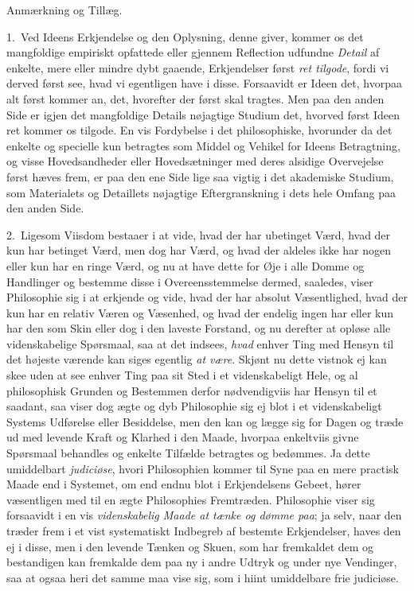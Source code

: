 \documentclass[12pt,a4paper]{book}
\newcommand{\apage}[1]{\marginnote{\footnotesize\textit{[#1]}}}
\begin{document}
\begin{center}Anmærkning og Tillæg.\end{center}

1.~Ved Ideens Erkjendelse og den Oplysning, denne giver, kommer os det
mangfoldige empiriskt \apage{123}  opfattede eller gjennem Reflection udfundne \emph{Detail}
af enkelte, mere eller mindre dybt gaaende, Erkjendelser først \emph{ret tilgode},
fordi vi derved først see, hvad vi egentligen have i disse. Forsaavidt er Ideen
det, hvorpaa alt først kommer an, det, hvorefter der først skal tragtes. Men paa
den anden Side er igjen det mangfoldige Details nøjagtige Studium det, hvorved
først Ideen ret kommer os tilgode. En vis Fordybelse i det philosophiske,
hvorunder da det enkelte og specielle kun betragtes som Middel og Vehikel for
Ideens Betragtning, og visse Hovedsandheder eller Hovedsætninger med deres
alsidige Overvejelse først hæves frem, er paa den ene Side lige saa vigtig i det
akademiske Studium, som Materialets og Detaillets nøjagtige Eftergranskning i
dets hele Omfang paa den anden Side.

2.~Ligesom Viisdom bestaaer i at vide, hvad der har ubetinget Værd, hvad der kun
har betinget Værd, men dog har Værd, og hvad der aldeles ikke har nogen eller kun
har en ringe Værd, og nu at have dette for Øje i alle Domme og Handlinger og
bestemme disse i Overeensstemmelse dermed, saaledes, viser Philosophie sig i at
erkjende og vide, hvad der har absolut Væsentlighed, hvad der kun har en relativ
Væren og Væsenhed, og hvad der endelig ingen har eller kun har den som Skin eller
dog i den laveste Forstand, og nu derefter at opløse alle videnskabelige \apage{124} 
Spørsmaal, saa at det indsees, \emph{hvad} enhver Ting med Hensyn til det højeste
værende kan siges egentlig \emph{at være}. Skjønt nu dette vistnok ej kan skee
uden at see enhver Ting paa sit Sted i et videnskabeligt Hele, og al philosophisk
Grunden og Bestemmen derfor nødvendigviis har Hensyn til et saadant, saa viser
dog ægte og dyb Philosophie sig ej blot i et videnskabeligt Systems Udførelse
eller Besiddelse, men den kan og lægge sig for Dagen og træde ud med levende Kraft
og Klarhed i den Maade, hvorpaa enkeltviis givne Spørsmaal behandles og enkelte
Tilfælde betragtes og bedømmes. Ja dette umiddelbart \emph{judiciøse}, hvori
Philosophien kommer til Syne paa en mere practisk Maade end i Systemet, om end
endnu blot i Erkjendelsens Gebeet, hører væsentligen med til en ægte Philosophies
Fremtræden. Philosophie viser sig forsaavidt i en vis \emph{videnskabelig Maade at
tænke og dømme paa}; ja selv, naar den træder frem i et vist systematiskt
Indbegreb af bestemte Erkjendelser, haves den ej i disse, men i den levende Tænken
og Skuen, som har fremkaldet dem og bestandigen kan fremkalde dem paa ny i andre
Udtryk og under nye Vendinger, saa at ogsaa heri det samme maa vise sig, som i
hiint umiddelbare frie judiciøse.
\end{document}

